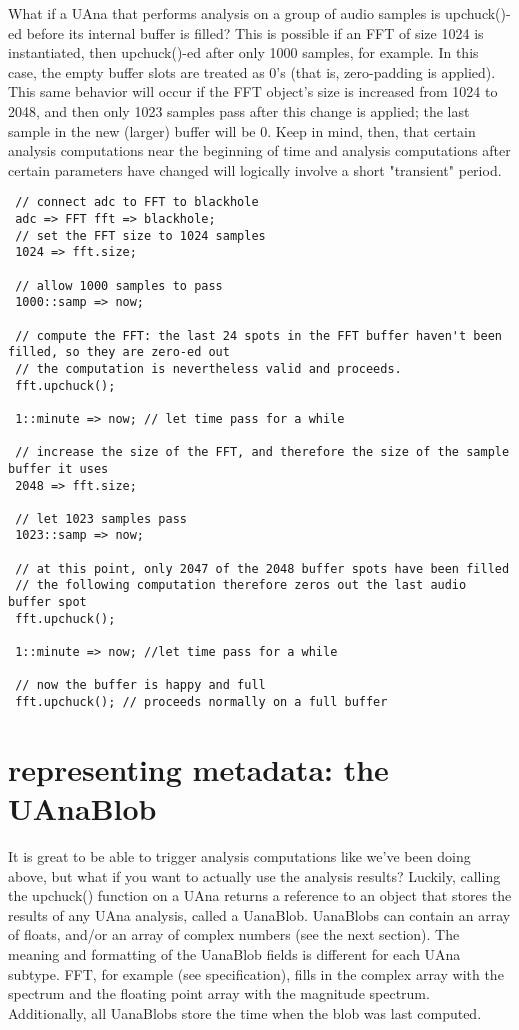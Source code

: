 What if a UAna that performs analysis on a group of audio samples is upchuck()-
ed before its internal buffer is filled? This is possible if an FFT of size
1024 is instantiated, then upchuck()-ed after only 1000 samples, for example.
In this case, the empty buffer slots are treated as 0's (that is, zero-padding
is applied). This same behavior will occur if the FFT object's size is
increased from 1024 to 2048, and then only 1023 samples pass after this change
is applied; the last sample in the new (larger) buffer will be 0. Keep in mind,
then, that certain analysis computations near the beginning of time and
analysis computations after certain parameters have changed will logically
involve a short "transient" period.

\begin{verbatim}
 // connect adc to FFT to blackhole
 adc => FFT fft => blackhole;
 // set the FFT size to 1024 samples
 1024 => fft.size;

 // allow 1000 samples to pass
 1000::samp => now;

 // compute the FFT: the last 24 spots in the FFT buffer haven't been filled, so they are zero-ed out
 // the computation is nevertheless valid and proceeds.
 fft.upchuck();

 1::minute => now; // let time pass for a while

 // increase the size of the FFT, and therefore the size of the sample buffer it uses
 2048 => fft.size;

 // let 1023 samples pass
 1023::samp => now;

 // at this point, only 2047 of the 2048 buffer spots have been filled
 // the following computation therefore zeros out the last audio buffer spot
 fft.upchuck();

 1::minute => now; //let time pass for a while

 // now the buffer is happy and full
 fft.upchuck(); // proceeds normally on a full buffer
\end{verbatim}

\section{representing metadata: the UAnaBlob}

It is great to be able to trigger analysis computations like we've been doing
above, but what if you want to actually use the analysis results? Luckily,
calling the upchuck() function on a UAna returns a reference to an object that
stores the results of any UAna analysis, called a UanaBlob. UanaBlobs can
contain an array of floats, and/or an array of complex numbers (see the next
section). The meaning and formatting of the UanaBlob fields is different for
each UAna subtype. FFT, for example (see specification), fills in the complex
array with the spectrum and the floating point array with the magnitude
spectrum. Additionally, all UanaBlobs store the time when the blob was last
computed.


